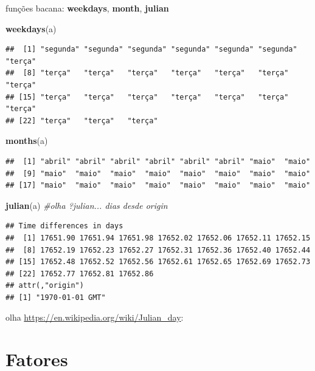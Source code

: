 \documentclass[]{book}
\newenvironment{Shaded}{\begin{snugshade}}{\end{snugshade}}
\newcommand{\KeywordTok}[1]{\textcolor[rgb]{0.13,0.29,0.53}{\textbf{#1}}}
\newcommand{\CommentTok}[1]{\textcolor[rgb]{0.56,0.35,0.01}{\textit{#1}}}
\newcommand{\NormalTok}[1]{#1}
\theoremstyle{definition}
\theoremstyle{definition}
\theoremstyle{definition}
\theoremstyle{remark}
\begin{document}
funções bacana: \textbf{weekdays}, \textbf{month}, \textbf{julian}

\begin{Shaded}
\begin{Highlighting}[]
\KeywordTok{weekdays}\NormalTok{(a)}
\end{Highlighting}
\end{Shaded}

\begin{verbatim}
##  [1] "segunda" "segunda" "segunda" "segunda" "segunda" "segunda" "terça"  
##  [8] "terça"   "terça"   "terça"   "terça"   "terça"   "terça"   "terça"  
## [15] "terça"   "terça"   "terça"   "terça"   "terça"   "terça"   "terça"  
## [22] "terça"   "terça"   "terça"
\end{verbatim}

\begin{Shaded}
\begin{Highlighting}[]
\KeywordTok{months}\NormalTok{(a)}
\end{Highlighting}
\end{Shaded}

\begin{verbatim}
##  [1] "abril" "abril" "abril" "abril" "abril" "abril" "maio"  "maio" 
##  [9] "maio"  "maio"  "maio"  "maio"  "maio"  "maio"  "maio"  "maio" 
## [17] "maio"  "maio"  "maio"  "maio"  "maio"  "maio"  "maio"  "maio"
\end{verbatim}

\begin{Shaded}
\begin{Highlighting}[]
\KeywordTok{julian}\NormalTok{(a) }\CommentTok{#olha ?julian... dias desde origin}
\end{Highlighting}
\end{Shaded}

\begin{verbatim}
## Time differences in days
##  [1] 17651.90 17651.94 17651.98 17652.02 17652.06 17652.11 17652.15
##  [8] 17652.19 17652.23 17652.27 17652.31 17652.36 17652.40 17652.44
## [15] 17652.48 17652.52 17652.56 17652.61 17652.65 17652.69 17652.73
## [22] 17652.77 17652.81 17652.86
## attr(,"origin")
## [1] "1970-01-01 GMT"
\end{verbatim}

olha \url{https://en.wikipedia.org/wiki/Julian_day}:

\section{Fatores}\label{fatores}
\end{document}

